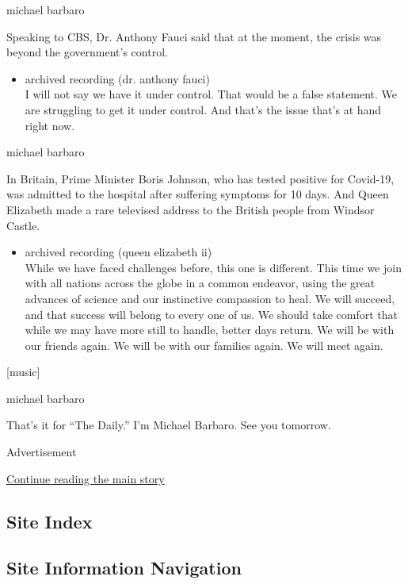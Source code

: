 michael barbaro

Speaking to CBS, Dr. Anthony Fauci said that at the moment, the crisis
was beyond the government's control.

\begin{itemize}
\tightlist
\item
  archived recording (dr. anthony fauci)\\
  I will not say we have it under control. That would be a false
  statement. We are struggling to get it under control. And that's the
  issue that's at hand right now.
\end{itemize}

michael barbaro

In Britain, Prime Minister Boris Johnson, who has tested positive for
Covid-19, was admitted to the hospital after suffering symptoms for 10
days. And Queen Elizabeth made a rare televised address to the British
people from Windsor Castle.

\begin{itemize}
\tightlist
\item
  archived recording (queen elizabeth ii)\\
  While we have faced challenges before, this one is different. This
  time we join with all nations across the globe in a common endeavor,
  using the great advances of science and our instinctive compassion to
  heal. We will succeed, and that success will belong to every one of
  us. We should take comfort that while we may have more still to
  handle, better days return. We will be with our friends again. We will
  be with our families again. We will meet again.
\end{itemize}

{[}music{]}

michael barbaro

That's it for ``The Daily.'' I'm Michael Barbaro. See you tomorrow.

Advertisement

\protect\hyperlink{after-bottom}{Continue reading the main story}

\hypertarget{site-index}{%
\subsection{Site Index}\label{site-index}}

\hypertarget{site-information-navigation}{%
\subsection{Site Information
Navigation}\label{site-information-navigation}}

